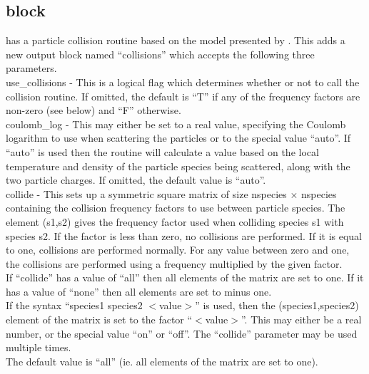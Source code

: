 
\subsection{ block}
\label{sec:collisions_block}
{\EPOCH} has a particle collision routine based on the model presented
by \citet{Sentoku}.
This adds a new output block named ``collisions'' which accepts the
following three parameters.\\

{\emphtext use\_collisions} - This is a logical flag which determines whether
  or not to call the collision routine. If omitted, the default is ``T'' if any
  of the frequency factors are non-zero (see below) and ``F'' otherwise.\\

{\emphtext coulomb\_log} - This may either be set to a real value, specifying
  the Coulomb logarithm to use when scattering the particles or to the special
  value ``auto''. If ``auto'' is used then the routine will calculate a value
  based on the local temperature and density of the particle species being
  scattered, along with the two particle charges.  If omitted,
  the default value is ``auto''.\\

{\emphtext collide} - This sets up a symmetric square matrix of size
  nspecies$\,\times\,$nspecies containing the collision frequency factors to
  use between particle species. The element (s1,s2) gives the frequency factor
  used when colliding species s1 with species s2.  If the factor is less than
  zero, no collisions are performed.  If it is equal to one, collisions are
  performed normally.  For any value between zero and one, the collisions are
  performed using a frequency multiplied by the given factor.\\
  If ``collide'' has a value of ``all'' then all elements of the matrix are
  set to one. If it has a value of ``none'' then all elements are set to minus
  one.\\
  If the syntax ``species1 species2 $<$value$>$'' is used, then the
  (species1,species2) element of the matrix is set to the factor
  ``$<$value$>$''.  This may either be a real number, or the special value
  ``on'' or ``off''. The ``collide'' parameter may be used multiple times.\\
  The default value is ``all'' (ie. all elements of the matrix are set to
  one).\\

